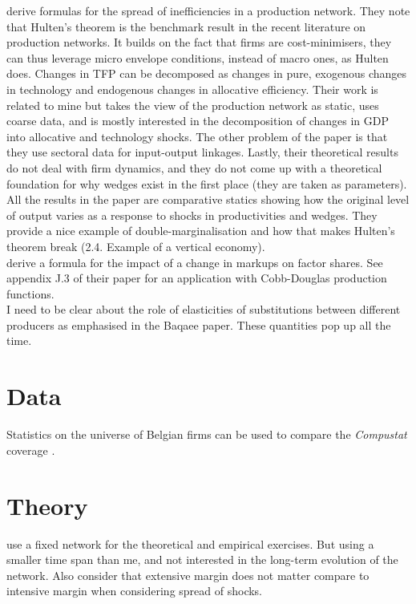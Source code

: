 \documentclass{amsart}
\theoremstyle{definition}
\theoremstyle{remark}
\numberwithin{equation}{section}
\begin{document}
\cite{baqaee2017productivity} derive formulas for the spread of inefficiencies in a production network. They note that Hulten's theorem \citep{hulten1978growth} is the benchmark result in the recent literature on production networks. It builds on the fact that firms are cost-minimisers, they can thus leverage micro envelope conditions, instead of macro ones, as Hulten does. Changes in TFP can be decomposed as changes in pure, exogenous changes in technology and endogenous changes in allocative efficiency. Their work is related to mine but takes the view of the production network as static, uses coarse data, and is mostly interested in the decomposition of changes in GDP into allocative and technology shocks. The other problem of the paper is that they use sectoral data for input-output linkages. Lastly, their theoretical results do not deal with firm dynamics, and they do not come up with a theoretical foundation for why wedges exist in the first place (they are taken as parameters). All the results in the paper are comparative statics showing how the original level of output varies as a response to shocks in productivities and wedges. They provide a nice example of double-marginalisation and how that makes Hulten's theorem break (2.4. Example of a vertical economy).\\

\cite{baqaee2017productivity} derive a formula for the impact of a change in markups on factor shares. See appendix J.3 of their paper for an application with Cobb-Douglas production functions.\\

I need to be clear about the role of elasticities of substitutions between different producers as emphasised in the Baqaee paper. These quantities pop up all the time. \\

\section{Data}

Statistics on the universe of Belgian firms can be used to compare the \textit{Compustat} coverage \citep{magerman2016heterogeneous}.

\section{Theory}
\label{sec:theory}

\cite{magerman2016heterogeneous} use a fixed network for the theoretical and empirical exercises. But using a smaller time span than me, and not interested in the long-term evolution of the network. Also consider that extensive margin does not matter compare to intensive margin when considering spread of shocks. \\
\end{document}
